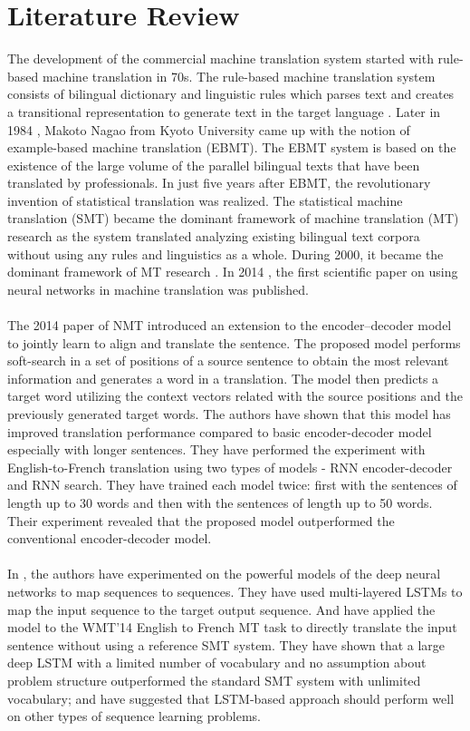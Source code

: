 \section{Literature Review}
The development of the commercial machine translation system started with rule-based machine translation in 70s. The rule-based machine translation system consists of bilingual dictionary and linguistic rules which parses text and creates a transitional representation to generate text in the target language \cite{freecodecamp.org_2018, systran}. Later in 1984 \cite{freecodecamp.org_2018}, Makoto Nagao from Kyoto University came up with the notion of example-based machine translation (EBMT). The EBMT system is based on the existence of the large volume of the parallel bilingual texts that have been translated by professionals. In just five years after EBMT, the revolutionary invention of statistical translation was realized. The statistical machine translation (SMT) became the dominant framework of machine translation (MT) research as the system translated analyzing existing bilingual text corpora without using any rules and linguistics as a whole. During 2000, it became the dominant framework of MT research \cite{freecodecamp.org_2018, hutchins2005history}. In 2014 \cite{freecodecamp.org_2018}, the first scientific paper on using neural networks in machine translation was published.
\\\\
The 2014 paper \cite{bahdanau2014neural} of NMT introduced an extension to the encoder–decoder model to jointly learn to align and translate the sentence. The proposed model performs soft-search in a set of positions of a source sentence to obtain the most relevant information and generates a word in a translation. The model then predicts a target word utilizing the context vectors related with the source positions and the previously generated target words. The authors have shown that this model has improved translation performance compared to basic encoder-decoder model especially with longer sentences. They have performed the experiment with English-to-French translation using two types of models - RNN encoder-decoder and RNN search. They have trained each model twice: first with the sentences of length up to 30 words and then with the sentences of length up to 50 words. Their experiment revealed that the proposed model outperformed the conventional encoder-decoder model.
\\\\
In \cite{sutskever2014sequence}, the authors have experimented on the powerful models of the deep neural networks to map sequences to sequences. They have used multi-layered LSTMs to map the input sequence to the target output sequence. And have applied the model to the WMT’14 English to French MT task to directly translate the input sentence without using a reference SMT system. They have shown that a large deep LSTM with a limited number of vocabulary and no assumption about problem structure outperformed the standard SMT system with unlimited vocabulary; and have suggested that LSTM-based approach should perform well on other types of sequence learning problems.
